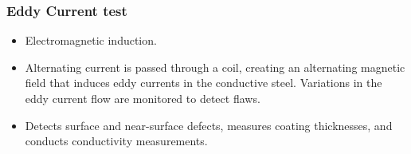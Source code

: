 \documentclass{article}
\begin{document}
\subsubsection*{Eddy Current test}

\begin{itemize}
    \item Electromagnetic induction.
    \item Alternating current is passed through a coil, creating an alternating
    magnetic field that induces eddy currents in the conductive steel.
    Variations in the eddy current flow are monitored to detect flaws.
    \item Detects surface and near-surface defects, measures coating
    thicknesses, and conducts conductivity measurements.
\end{itemize}
\end{document}
